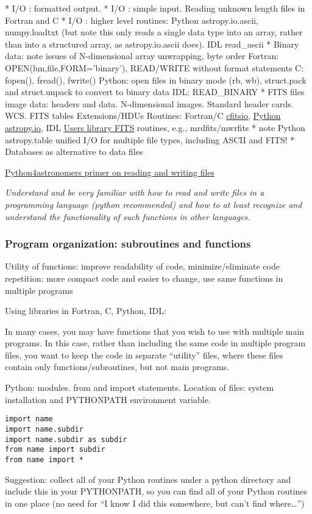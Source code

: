 \documentclass{article}
\newcommand{\test}[1]{%
    \begin{center}
        \colorbox{hl}{\parbox{0.9\textwidth}{\emph{#1}}}
    \end{center}}
\begin{document}
* I/O : formatted output.
* I/O : simple input. Reading unknown length files in Fortran and C
* I/O : higher level routines: Python astropy.io.ascii, numpy.loadtxt
(but note this only reads a single data type into an array, rather
than into a structured array, as astropy.io.ascii does). IDL
read\_ascii
* Binary data: note issues of N-dimensional array unwrapping, byte order
Fortran: OPEN(lun,file,FORM='binary'), READ/WRITE without format
statements
C: fopen(), fread(), fwrite()
Python: open files in binary mode (rb, wb), struct.pack and
struct.unpack to convert to binary data
IDL: READ\_BINARY
* FITS files
image data: headers and data. N-dimensional images. Standard header
cards. WCS.
FITS tables
Extensions/HDUs
Routines: Fortran/C
\href{http://heasarc.gsfc.nasa.gov/fitsio/fitsio.html}
{cfitsio},
\href{http://astropy.readthedocs.io/en/latest/io/fits/index.html}
{Python astropy.io}, IDL
\href{http://idlastro.gsfc.nasa.gov/contents.html#C9}
{Users library FITS}
routines, e.g., mrdfits/mwrfits
* note Python astropy.table unified I/O for multiple file types,
including ASCII and FITS!
* Databases as alternative to data files

\href{https://python4astronomers.github.io/files/files.html}
{Python4astronomers primer on reading and writing files}

\test{Understand and be very familiar with how to read and write files
in a programming language (python recommended) and how to at least
recognize and understand the functionality of such functions in other
languages.}
\subsubsection{Program organization: subroutines and functions}
Utility of functions:
    improve readability of code,
    minimize/eliminate code repetition: more compact code and easier to
    change,
    use same functions in multiple programs

Using libraries in Fortran, C, Python, IDL:

In many cases, you may have functions that you wish to use with
multiple main programs. In this case, rather than including the same
code in multiple program files, you want to keep the code in separate
``utility'' files, where these files contain only
functions/subroutines, but not main programs.

Python: modules. from and import statements. Location of files: system
installation and PYTHONPATH environment variable.
\begin{verbatim}
import name
import name.subdir
import name.subdir as subdir
from name import subdir
from name import *
\end{verbatim}
Suggestion: collect all of your Python routines under a python
directory and include this in your PYTHONPATH, so you can find all of
your Python routines in one place (no need for ``I know I did this
somewhere, but can't find where\ldots'')
\end{document}
